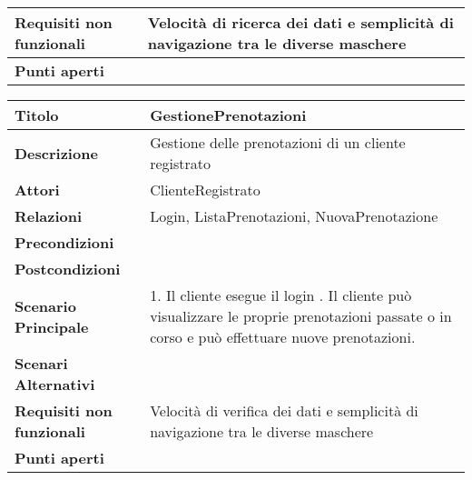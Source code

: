\begin{tabular} {|P{4.5cm}|P{12.5cm}|}
  \hline
    \textbf{Requisiti non funzionali} & Velocità di ricerca dei dati e semplicità di navigazione tra le diverse maschere\\
  \hline
    \textbf{Punti aperti} &\\
  \hline
\end{tabular}
\hfill
\break

\begin{tabular} {|P{4.5cm}|P{12.5cm}|}\hline
  \textbf{Titolo} & GestionePrenotazioni\\
  \hline
    \textbf{Descrizione} & Gestione delle prenotazioni di un cliente registrato\\
  \hline
    \textbf{Attori} & ClienteRegistrato\\
  \hline
    \textbf{Relazioni} & Login, ListaPrenotazioni, NuovaPrenotazione\\
  \hline
    \textbf{Precondizioni} &\\
  \hline
    \textbf{Postcondizioni} &\\
  \hline
    \textbf{Scenario Principale} & 1. Il cliente esegue il login . Il cliente può visualizzare le proprie prenotazioni passate o in corso e può effettuare nuove prenotazioni.\\
  \hline
    \textbf{Scenari Alternativi} &\\
  \hline
    \textbf{Requisiti non funzionali} & Velocità di verifica dei dati e semplicità di navigazione tra le diverse maschere\\
  \hline
    \textbf{Punti aperti} &\\
  \hline
\end{tabular}
\hfill
\break

